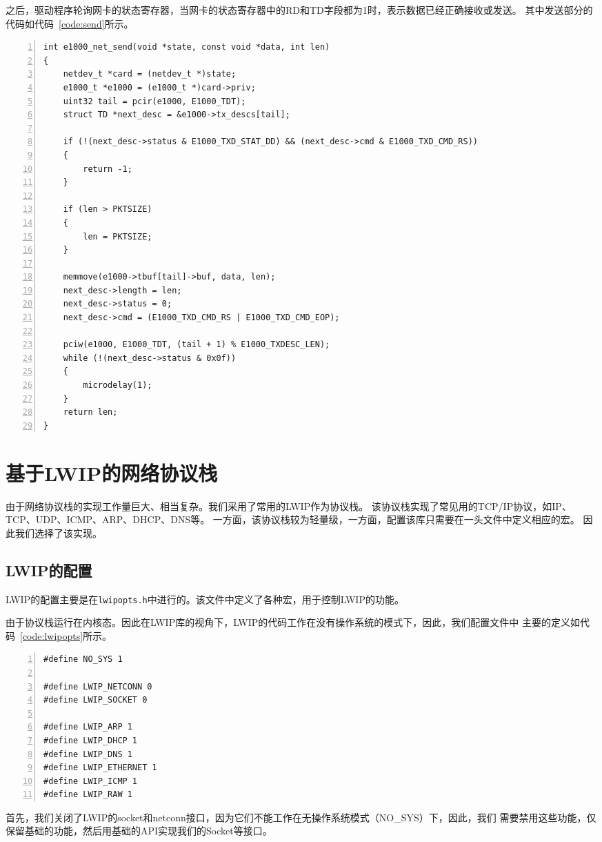\documentclass[a4paper,twoside]{ctexrep}
\begin{document}
\begin{spacing}{1.2}
之后，驱动程序轮询网卡的状态寄存器，当网卡的状态寄存器中的RD和TD字段都为1时，表示数据已经正确接收或发送。
其中发送部分的代码如代码~\ref{code:send}所示。
\begin{lstlisting}[numbers=left,style=CppStyle,caption=数据发送,label={code:send}]
int e1000_net_send(void *state, const void *data, int len)
{
	netdev_t *card = (netdev_t *)state;
	e1000_t *e1000 = (e1000_t *)card->priv;
	uint32 tail = pcir(e1000, E1000_TDT);
	struct TD *next_desc = &e1000->tx_descs[tail];

	if (!(next_desc->status & E1000_TXD_STAT_DD) && (next_desc->cmd & E1000_TXD_CMD_RS))
	{
		return -1;
	}

	if (len > PKTSIZE)
	{
		len = PKTSIZE;
	}

	memmove(e1000->tbuf[tail]->buf, data, len);
	next_desc->length = len;
	next_desc->status = 0;
	next_desc->cmd = (E1000_TXD_CMD_RS | E1000_TXD_CMD_EOP);

	pciw(e1000, E1000_TDT, (tail + 1) % E1000_TXDESC_LEN);
	while (!(next_desc->status & 0x0f))
	{
		microdelay(1);
	}
	return len;
}
\end{lstlisting}


\section{基于LWIP的网络协议栈}

由于网络协议栈的实现工作量巨大、相当复杂。我们采用了常用的LWIP作为协议栈。
该协议栈实现了常见用的TCP/IP协议，如IP、TCP、UDP、ICMP、ARP、DHCP、DNS等。
一方面，该协议栈较为轻量级，一方面，配置该库只需要在一头文件中定义相应的宏。
因此我们选择了该实现。

\subsection{LWIP的配置}

LWIP的配置主要是在\texttt{lwipopts.h}中进行的。该文件中定义了各种宏，用于控制LWIP的功能。

由于协议栈运行在内核态。因此在LWIP库的视角下，LWIP的代码工作在没有操作系统的模式下，因此，我们配置文件中
主要的定义如代码~\ref{code:lwipopts}所示。
\begin{lstlisting}[numbers=left,style=CppStyle,caption=LWIP配置,label={code:lwipopts}]
#define NO_SYS 1

#define LWIP_NETCONN 0
#define LWIP_SOCKET 0

#define LWIP_ARP 1
#define LWIP_DHCP 1
#define LWIP_DNS 1
#define LWIP_ETHERNET 1
#define LWIP_ICMP 1
#define LWIP_RAW 1
\end{lstlisting}
首先，我们关闭了LWIP的socket和netconn接口，因为它们不能工作在无操作系统模式（NO\_SYS）下，因此，我们
需要禁用这些功能，仅保留基础的功能，然后用基础的API实现我们的Socket等接口。


\end{spacing}
\end{document}
